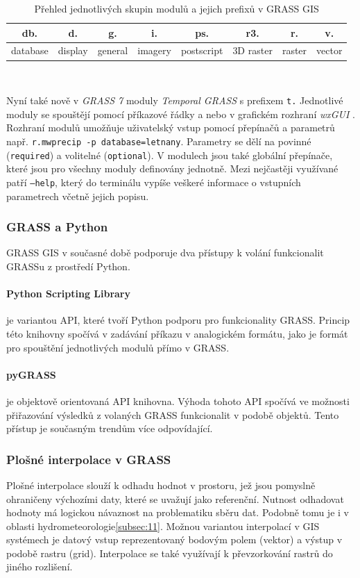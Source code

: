 \documentclass[a4paper,12pt,oneside]{report}
\begin{document}
\begin{table}[h]
\centering
\begin{tabular}{|cccccccc|}
\hline
db. & d. & g. & i. & ps. & r3. & r. & v. \\
\hline \hline
database & display & general & imagery & postscript & 3D raster & raster & vector \\ \hline
\end{tabular}
\caption{Přehled jednotlivých skupin modulů a jejich prefixů v GRASS GIS}
\label{tab:module}
\end{table}
\

Nyní také nově v \textit{GRASS 7} moduly \textit{Temporal GRASS} s prefixem \texttt{t.} Jednotlivé moduly se spouštějí pomocí příkazové řádky a nebo v grafickém rozhraní \textit{wxGUI} . Rozhraní modulů umožňuje uživatelský vstup pomocí přepínačů a parametrů např. \texttt{r.mwprecip -p database=letnany}. Parametry se dělí na povinné (\texttt{required}) a volitelné (\texttt{optional}). V modulech jsou také globální přepínače, které jsou pro všechny moduly definovány jednotně. Mezi nejčastěji využívané patří \texttt{--help}, který do terminálu vypíše veškeré informace o vstupních parametrech včetně jejich  popisu.

\subsubsection*{GRASS a Python}
GRASS GIS v současné době podporuje dva přístupy k volání funkcionalit GRASSu z prostředí Python.
\paragraph*{Python Scripting Library} je variantou API, které tvoří Python podporu pro funkcionality GRASS. Princip této knihovny spočívá v zadávání příkazu v analogickém formátu, jako je formát pro spouštění jednotlivých modulů přímo v GRASS.
\paragraph*{pyGRASS} je objektově orientovaná API knihovna. Výhoda tohoto API spočívá ve možnosti přiřazování výsledků z volaných GRASS funkcionalit v podobě objektů. Tento přístup je současným trendům více odpovídající.

\subsubsection*{Plošné interpolace v GRASS }
\label{sec:plostneinterpolace}
Plošné interpolace slouží k odhadu hodnot v prostoru, jež jsou pomyslně ohraničeny výchozími daty, které se uvažují jako referenční. Nutnost odhadovat hodnoty má logickou návaznost na problematiku sběru dat.  Podobně tomu je i v oblasti hydrometeorologie\ref{subsec:11}. Možnou variantou interpolací v GIS systémech je datový vstup reprezentovaný bodovým polem (vektor) a výstup v podobě rastru (grid). Interpolace se také využívají k převzorkování rastrů do jiného rozlišení.
\end{document}
